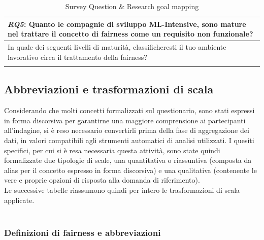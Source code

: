 \begin{longtable}{| p{} |}
        \\ \hline
        \rowcolor{Gray}
        \textbf{\textit{{RQ5}}}:  Quanto le compagnie di sviluppo ML-Intensive, sono mature nel trattare il concetto di fairness come un requisito non funzionale?\\
        
        \hline 
        In quale dei seguenti livelli di maturità, classificheresti il tuo ambiente lavorativo circa il trattamento della fairness?
        \\ \hline
        \caption{Survey Question \& Research goal mapping} %
    \label{tab:myfirstlongtable}
    \end{longtable}
    
    \subsection{Abbreviazioni e trasformazioni di scala}
    
    Considerando che molti concetti formalizzati sul questionario, sono stati espressi in forma discorsiva per garantirne una maggiore comprensione ai partecipanti all'indagine, si è reso necessario convertirli prima della fase di aggregazione dei dati, in valori compatibili agli strumenti automatici di analisi utilizzati. I quesiti specifici, per cui si è resa necessaria questa attività, sono state quindi formalizzate due tipologie di scale, una quantitativa o riassuntiva (composta da alias per il concetto espresso in forma discorsiva) e una qualitativa (contenente le vere e proprie opzioni di risposta alla domanda di riferimento).\\
    
    Le successive tabelle riassumono quindi per intero le trasformazioni di scala applicate.\\\\
    
    
    \subsubsection{Definizioni di fairness e abbreviazioni}
    
    \begin{center}
		\hspace*{-5mm}%
	\end{center}
	
